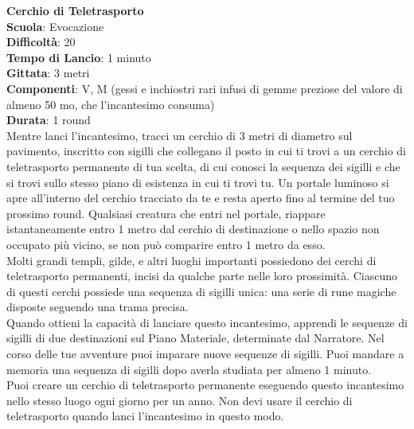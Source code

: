 \begin{multicols}{2}
\medskip\textbf{Cerchio di Teletrasporto}\\
\textbf{Scuola}: Evocazione\\
\textbf{Difficoltà}:  20\\
\textbf{Tempo di Lancio}: 1 minuto\\
\textbf{Gittata}: 3 metri\\
\textbf{Componenti}: V, M (gessi e inchiostri rari infusi di gemme preziose del valore di almeno 50 mo, che l'incantesimo consuma)\\
\textbf{Durata}: 1 round\\
Mentre lanci l'incantesimo, tracci un cerchio di 3 metri di diametro sul pavimento, inscritto con sigilli che collegano il posto in cui ti trovi a un cerchio di teletrasporto permanente di tua scelta, di cui conosci la sequenza dei sigilli e che si trovi sullo stesso piano di esistenza in cui ti trovi tu. Un portale luminoso si apre all'interno del cerchio tracciato da te e resta aperto fino al termine del tuo prossimo round. Qualsiasi creatura che entri nel portale, riappare istantaneamente entro 1 metro dal cerchio di destinazione o nello spazio non
occupato più vicino, se non può comparire entro 1 metro da esso.\\
Molti grandi templi, gilde, e altri luoghi importanti possiedono dei cerchi di teletrasporto permanenti, incisi da qualche parte nelle loro prossimità. Ciascuno di questi cerchi possiede una sequenza di sigilli unica: una serie di rune magiche disposte seguendo una trama precisa.\\ Quando ottieni la capacità di lanciare questo incantesimo, apprendi le sequenze di sigilli di
due destinazioni sul Piano Materiale, determinate dal Narratore. Nel corso delle tue avventure puoi imparare nuove sequenze di sigilli. Puoi mandare a memoria una sequenza di sigilli dopo averla studiata per almeno 1 minuto.\\
Puoi creare un cerchio di teletrasporto permanente eseguendo questo incantesimo nello stesso luogo ogni giorno per un anno. Non devi usare il cerchio di teletrasporto quando lanci l'incantesimo in questo modo.


\end{multicols}
